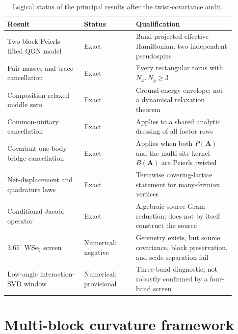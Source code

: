\documentclass[11pt]{article}
\theoremstyle{remark}
\begin{document}
\begin{table}[t]
\centering
\caption{Logical status of the principal results after the twist-covariance audit.}
\label{tab:status}
\begin{tabular}{@{}L{0.31\linewidth}L{0.21\linewidth}L{0.40\linewidth}@{}}
\toprule
Result & Status & Qualification\\
\midrule
Two-block Peierls-lifted QGN model & Exact & Band-projected effective Hamiltonian; two independent pseudospins\\
Pair masses and trace cancellation & Exact & Every rectangular torus with $N_x,N_y\ge3$\\
Composition-relaxed middle zero & Exact & Ground-energy envelope; not a dynamical relaxation theorem\\
Common-unitary cancellation & Exact & Applies to a shared analytic dressing of all factor rows\\
Covariant one-body bridge cancellation & Exact & Applies when both $P(\bm A)$ and the multi-site kernel $B(\bm A)$ are Peierls twisted\\
Net-displacement and quadrature laws & Exact & Termwise covering-lattice statement for many-fermion vertices\\
Conditional Jacobi operator & Exact & Algebraic source-Gram reduction; does not by itself construct the source\\
$3.65^\circ$ WSe$_2$ screen & Numerical: negative & Geometry exists, but source covariance, block preservation, and scale separation fail\\
Low-angle interaction-SVD window & Numerical: provisional & Three-band diagnostic; not robustly confirmed by a four-band screen\\
\bottomrule
\end{tabular}
\end{table}

\section{Multi-block curvature framework}
\label{sec:framework}
\end{document}
